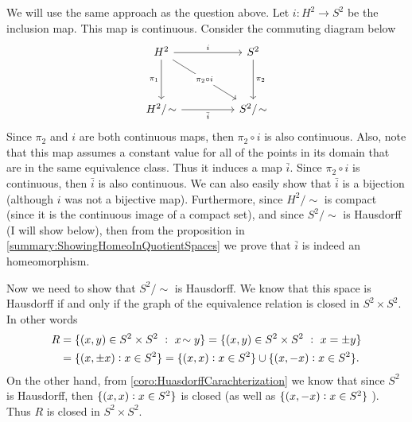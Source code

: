 \begin{solution}
	We will use the same approach as the question above. Let $ i: H^2 \to S^2 $ be the inclusion map. This map is continuous. Consider the commuting diagram below
	\[\begin{tikzcd}
		{H^2} && {S^2} \\
		\\
		{H^2/\sim} && {S^2/\sim}
		\arrow["i", from=1-1, to=1-3]
		\arrow["{\pi_1}"', from=1-1, to=3-1]
		\arrow["{\pi_2\circ i}"{description}, from=1-1, to=3-3]
		\arrow["{\pi_2}", from=1-3, to=3-3]
		\arrow["{\bar{i}}"', from=3-1, to=3-3]
	\end{tikzcd}\]
	Since $ \pi_2 $ and $ i $ are both continuous maps, then $ \pi_2\circ i $ is also continuous. Also, note that this map assumes a constant value for all of the points in its domain that are in the same equivalence class. Thus it induces a map $ \bar{i} $. Since $ \pi_2\circ i $ is continuous, then $ \bar{i} $ is also continuous. We can also easily show that $ \bar{i} $ is a bijection (although $ i $ was not a bijective map). Furthermore, since $ H^2/\sim $ is compact (since it is the continuous image of a compact set), and since $ S^2/\sim $ is Hausdorff (I will show below), then from the proposition in \autoref{summary:ShowingHomeoInQuotientSpaces} we prove that $ \bar{i} $ is indeed an homeomorphism.
	
	Now we need to show that $ S^2/\sim $ is Hausdorff. We know that this space is Hausdorff if and only if the graph of the equivalence relation is closed in $ S^2\times S^2 $. In other words
	\begin{align*}
		R &= \set{ (x,y)\in S^2\times S^2\ :\ x\sim y } = \set{ (x,y)\in S^2\times S^2\ :\ x= \pm y } \\
		&= \set{ (x,\pm x): x \in S^2} = \set{ (x,x): x \in S^2}\cup \set{ (x,-x): x \in S^2}.
	\end{align*}
	On the other hand, from \autoref{coro:HuasdorffCarachterization} we know that since $ S^2 $ is Hausdorff, then $ \{ (x,x): x \in S^2\} $ is closed (as well as $ \{ (x,-x): x \in S^2\} $ ). Thus $ R $ is closed in $ S^2\times S^2 $.
\end{solution}
